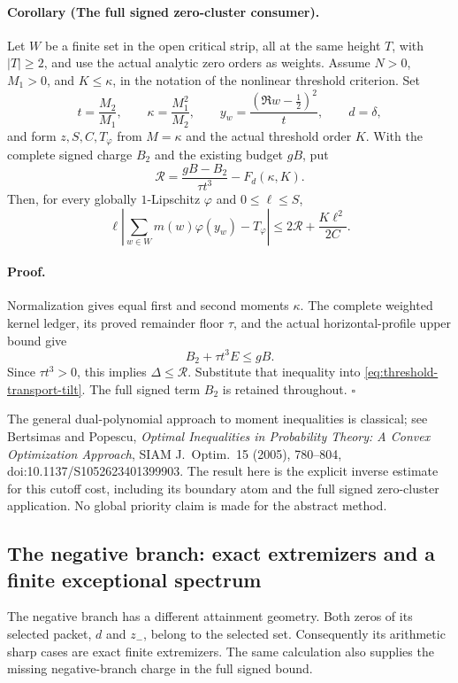 \paragraph{Corollary (The full signed zero-cluster consumer).}
\label{cor:threshold-transport-zero-budget}
Let \(W\) be a finite set in the open critical strip, all at the same
height \(T\), with \(|T|\ge2\), and use the actual analytic zero orders
as weights.  Assume \(N>0\), \(M_1>0\), and \(K\le\kappa\), in the
notation of the nonlinear threshold criterion.  Set
\[
 t=\frac{M_2}{M_1},\qquad \kappa=\frac{M_1^2}{M_2},\qquad
 y_w=\frac{(\Re w-\tfrac12)^2}{t},\qquad d=\delta,
\]
and form \(z,S,C,T_\varphi\) from \(M=\kappa\) and the actual
threshold order \(K\).  With the complete signed charge \(B_2\) and
the existing budget \(gB\), put
\[
 \mathcal R=\frac{gB-B_2}{\tau t^3}-F_d(\kappa,K).
\]
Then, for every globally \(1\)-Lipschitz \(\varphi\) and
\(0\le\ell\le S\),
\[
 \ell\left|\sum_{w\in W}m(w)\varphi(y_w)-T_\varphi\right|
 \le2\mathcal R+\frac{K\ell^2}{2C}.
\]

\paragraph{Proof.}
Normalization gives equal first and second moments \(\kappa\).
The complete weighted kernel ledger, its proved remainder floor
\(\tau\), and the actual horizontal-profile upper bound give
\[
 B_2+\tau t^3 E\le gB.
\]
Since \(\tau t^3>0\), this implies \(\Delta\le\mathcal R\).
Substitute that inequality into
\eqref{eq:threshold-transport-tilt}.  The full signed term \(B_2\)
is retained throughout.
\hfill\(\square\)

The general dual-polynomial approach to moment inequalities is classical;
see Bertsimas and Popescu, \emph{Optimal Inequalities in Probability
Theory: A Convex Optimization Approach}, SIAM J.\ Optim.\ 15 (2005),
780--804, doi:10.1137/S1052623401399903.  The result here is the explicit
inverse estimate for this cutoff cost, including its boundary atom and
the full signed zero-cluster application.  No global priority claim is
made for the abstract method.

\subsection{The negative branch: exact extremizers and a finite exceptional spectrum}
\label{sec:negative-integer-phase}

The negative branch has a different attainment geometry.  Both zeros of its
selected packet, \(d\) and \(z_-\), belong to the selected set.  Consequently
its arithmetic sharp cases are exact finite extremizers.  The same calculation
also supplies the missing negative-branch charge in the full signed bound.

